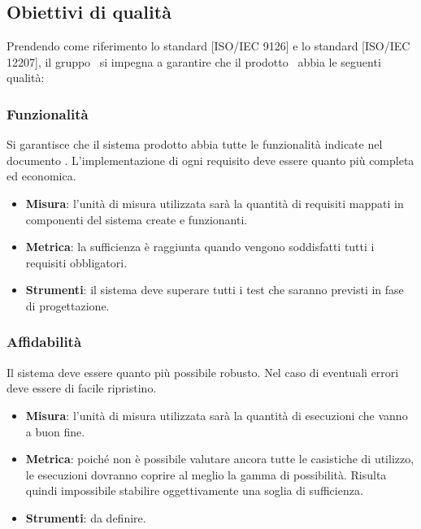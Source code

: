 \documentclass[../PianoDiQualifica.tex]{subfiles}
\begin{document}
		\subsection{Obiettivi di qualità}
			Prendendo come riferimento lo standard [ISO/IEC 9126] e lo
			standard [ISO/IEC 12207], il gruppo \kaleidoscode\ si impegna a
			garantire che il prodotto \progetto\ abbia le seguenti qualità:
			\subsubsection{Funzionalità}
				Si garantisce che il sistema prodotto abbia tutte le funzionalità
				indicate nel documento \analisideirequisitiv. L'implementazione di
				ogni requisito deve essere quanto più completa ed economica.
				\begin{itemize}
					\item \textbf{Misura}: l'unità di misura utilizzata sarà la
					quantità di requisiti mappati in componenti del sistema create
					e funzionanti.
					\item \textbf{Metrica}: la sufficienza è raggiunta quando
					vengono soddisfatti tutti i requisiti obbligatori.
					\item \textbf{Strumenti}: il sistema deve superare tutti i
					test che saranno previsti in fase di progettazione.
				\end{itemize}
			\subsubsection{Affidabilità}
				Il sistema deve essere quanto più possibile robusto. Nel caso di
				eventuali errori deve essere di facile ripristino.
				\begin{itemize}
					\item \textbf{Misura}: l'unità di misura utilizzata sarà la
					quantità di esecuzioni che vanno a buon fine.
					\item \textbf{Metrica}: poiché non è possibile valutare ancora
					tutte le casistiche di utilizzo, le esecuzioni dovranno
					coprire al meglio la gamma di possibilità. Risulta quindi
					impossibile stabilire oggettivamente una soglia di
					sufficienza.
					\item \textbf{Strumenti}: da definire.
				\end{itemize}
\end{document}

